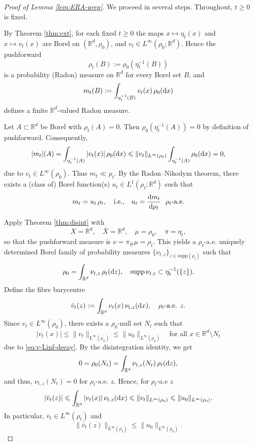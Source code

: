 \documentclass[10pt,reqno]{amsart}
\renewcommand{\ge}{\geqslant}
\renewcommand{\leq}{\leqslant}
\renewcommand{\le}{\leqslant}
\numberwithin{equation}{section}
\newcommand{\R}{\mathbb R}
\newcommand{\intr}{\int_{\R^d}}
\newcommand{\rd}{\textnormal{d}}
\newcommand{\dx}{\textnormal{d}x}
\newcommand{\dz}{\textnormal{d}z}
\newcommand{\supp}{\text{supp}}
\begin{document}
\begin{proof}[Proof of Lemma \ref{lem:ERA-prep}]
We proceed in several steps. Throughout, $t\ge0$ is fixed.

\medskip
{}
By Theorem \ref{thm:ext}, for each fixed $t\ge0$ the maps
$x\mapsto \eta_t(x)$ and $x\mapsto v_t(x)$ are Borel on $(\R^d,\rho_0)$, and
$v_t\in L^\infty(\rho_0;\R^d)$.  Hence the pushforward
\[
\rho_t(B):=\rho_0(\eta_t^{-1}(B))
\]
is a probability (Radon) measure on $\R^d$ for every Borel set $B$, and
\[
m_t(B):=\int_{\eta_t^{-1}(B)} v_t(x)\,\rho_0(\dx)
\]
defines a finite $\R^d$-valued Radon measure. 

\medskip
{}
Let $A\subset\R^d$ be Borel with $\rho_t(A)=0$. Then $\rho_0(\eta_t^{-1}(A))=0$ by definition of pushforward. Consequently,
\[
|m_t|(A) =\int_{\eta_t^{-1}(A)} |v_t(x)|\,\rho_0(\dx) \leq \|v_t\|_{L^\infty(\rho_0)}\int_{\eta_t^{-1}(A)} \rho_0(\dx) =0,
\]
due to $v_t\in L^\infty(\rho_0)$.
Thus $m_t\ll \rho_t$. By the Radon--Nikodym theorem, there exists a (class of) Borel function(s)
$u_t\in L^1(\rho_t;\R^d)$ such that
\[
m_t = u_t\,\rho_t, \quad\text{i.e.,}\quad u_t = \frac{\rd m_t}{\rd \rho_t}\ \ \rho_t\text{-a.e.}
\]

 
\medskip
{}
Apply Theorem \ref{thm:disint} with 
\[
X=\R^d,\quad \bar X=\R^d,\quad \mu=\rho_0,\quad \pi=\eta_t,
\]
so that the pushforward measure is $\nu=\pi_\#\mu=\rho_t$.  This yields a $\rho_t$-a.e.  uniquely determined Borel family of probability measures 
$\{\nu_{t,z}\}_{z\in\supp(\rho_t)}$ such that
\begin{equation*}%
\rho_0=\intr \nu_{t,z}\,\rho_t(\dz), \quad \supp\,\nu_{t,z}\subset   \eta_t^{-1}(\{z\}).
\end{equation*}
Define the fibre barycentre 
\[
\bar v_t(z):=\intr v_t(x)\,\nu_{t,z}(\dx),\quad \rho_t\text{-a.e. }z.
\]
Since $v_t\in L^\infty(\rho_0)$, there exists a $\rho_0$-null set $N_t$ such that
\[
|v_t(x)|  \le \|v_t\|_{L^\infty(\rho_0)} \le \|u_0\|_{L^\infty(\rho_0)}   \quad \text{for all } x \in \R^d \setminus N_t
\]
due to \eqref{eq:v-Linf-decay}. By the disintegration identity, we get
\[
0 = \rho_0(N_t) = \intr \nu_{t,z}(N_t) \,\rho_t(\dz),
\]
and thus, $\nu_{t,z}(N_t) = 0$ for $\rho_t$-a.e. $z$. Hence, for $\rho_t$-a.e $z$
\[
|\bar v_t(z)| \le \intr |v_t(x)|\,\nu_{t,z}(\dx)  \leq \|v_t\|_{L^\infty(\rho_0)} \le \|u_0\|_{L^\infty(\rho_0)}.  
\]
In particular, $\bar v_t\in L^\infty(\rho_t)$ and
\[
\|\bar v_t(z)\|_{L^\infty(\rho_t)} \le \|u_0\|_{L^\infty(\rho_0)}.  
\]


\end{proof}
\end{document}
